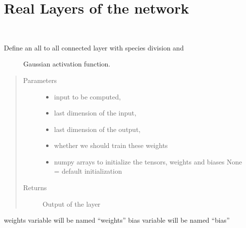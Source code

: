 \documentclass[letterpaper,10pt,english]{sphinxmanual}
\begin{document}
\chapter{Real Layers of the network}
\label{\detokenize{neuralnet/layers:module-layers}}\label{\detokenize{neuralnet/layers:real-layers-of-the-network}}\label{\detokenize{neuralnet/layers::doc}}

\begin{fulllineitems}
\label{\detokenize{neuralnet/layers:layers.hidden_layer_gauss}}~\begin{description}
\item[{Define an all to all connected layer with species division and}] \leavevmode
Gaussian activation function.

\end{description}
\begin{quote}\begin{description}
\item[{Parameters}] \leavevmode\begin{itemize}
\item {} 
 \textendash{} input to be computed,

\item {} 
 \textendash{} last dimension of the input,

\item {} 
 \textendash{} last dimension of the output,

\item {} 
 \textendash{} whether we should train these weights

\item {} 
 \textendash{} numpy arrays to initialize the tensors, weights and biases
None = default initialization

\end{itemize}

\item[{Returns}] \leavevmode
Output of the layer

\end{description}\end{quote}

weights variable will be named “weights”
bias variable will be named “bias”

\end{fulllineitems}
\end{document}
